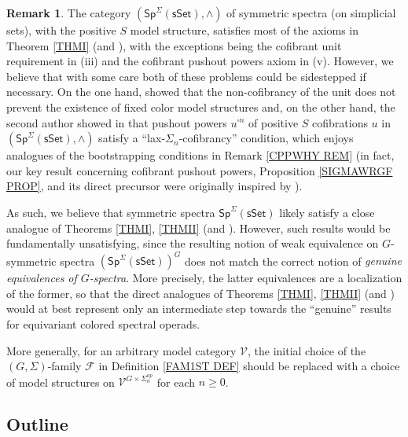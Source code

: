 \documentclass[a4paper,10pt
,draft
]{article}%
\numberwithin{equation}{section}
\numberwithin{figure}{section}
\theoremstyle{definition} %
\newtheorem{remark}[equation]{Remark}%
\newcommand{\F}{\ensuremath{\mathcal F}}
\newcommand{\V}{\ensuremath{\mathcal V}}
\newcommand{\1}{\ensuremath{\mathbbm 1}}%
\begin{document}
\begin{remark}\label{SPNONEX REM}
	The category $(\mathsf{Sp}^{\Sigma}(\mathsf{sSet}),\wedge)$
	of symmetric spectra (on simplicial sets),
	with the positive $S$ model structure,
	satisfies most of the axioms in Theorem
	\ref{THMI} (and \cite[Thm. \ref{AC-THMA}]{BP_ACOP}), 
	with the exceptions being 
	the cofibrant unit requirement in (iii)
	and the cofibrant pushout powers axiom in (v).
	However, we believe that with some care 
	both of these problems could be sidestepped
	if necessary. 
	On the one hand, \cite{GV12}
	showed that the non-cofibrancy of the unit 
	does not prevent the existence of fixed color model structures
	and, on the other hand, 
	the second author showed in \cite{Pe16}
	that pushout powers $u^{\square n}$ of positive $S$ cofibrations $u$
	in $(\mathsf{Sp}^{\Sigma}(\mathsf{sSet}),\wedge)$
	satisfy a ``lax-$\Sigma_n$-cofibrancy'' condition,
	which enjoys analogues of the bootstrapping conditions
	in Remark \ref{CPPWHY REM}
	(in fact, our key result concerning cofibrant pushout powers,
	Proposition \ref{SIGMAWRGF PROP}, and its direct precursor
	\cite[Prop. 6.24]{BP_geo}
	were originally inspired by \cite[Thm. 1.2]{Pe16}).

	As such, we believe that symmetric spectra
	$\mathsf{Sp}^{\Sigma}(\mathsf{sSet})$
	likely satisfy a close analogue of Theorems 
	\ref{THMI}, \ref{THMII} (and \cite[Thm. \ref{AC-THMA}]{BP_ACOP}).
	However, such results 
	would be fundamentally unsatisfying, 
	since the resulting notion of weak equivalence on
	$G$-symmetric spectra
	$\left(\mathsf{Sp}^{\Sigma}(\mathsf{sSet})\right)^G$
	does not match the correct notion of 
	\emph{genuine equivalences of $G$-spectra}.
	More precisely, the latter equivalences are a localization of the former, so that the direct analogues of 
	Theorems \ref{THMI}, \ref{THMII} (and \cite[Thm. \ref{AC-THMA}]{BP_ACOP})
	would at best represent only an intermediate step
	towards the ``genuine'' results
	for equivariant colored spectral operads.

	More generally,
	for an arbitrary model category $\V$,
	the initial choice of the $(G,\Sigma)$-family $\F$ in  
	Definition \ref{FAM1ST DEF}
	should be replaced with a choice of model structures on
	$\V^{G \times \Sigma_n^{op}}$
	for each $n \geq 0$.	 
\end{remark}



\subsection{Outline}
\end{document}
